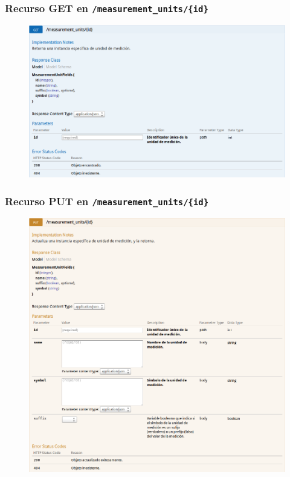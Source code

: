 \newpage


\subsubsection{Recurso GET en \texttt{/measurement\_units/\{id\}}}

\begin{figure}[h]
  \centering
  \includegraphics[width=\textwidth,height=.75\textheight,keepaspectratio]{img/especificacion_api/measurementUnitView_get}
  \label{measurementUnitView_get}
\end{figure}

\newpage


\subsubsection{Recurso PUT en \texttt{/measurement\_units/\{id\}}}

\begin{figure}[h]
  \centering
  \includegraphics[width=\textwidth,height=.75\textheight,keepaspectratio]{img/especificacion_api/measurementUnitView_put}
  \label{measurementUnitView_put}
\end{figure}

